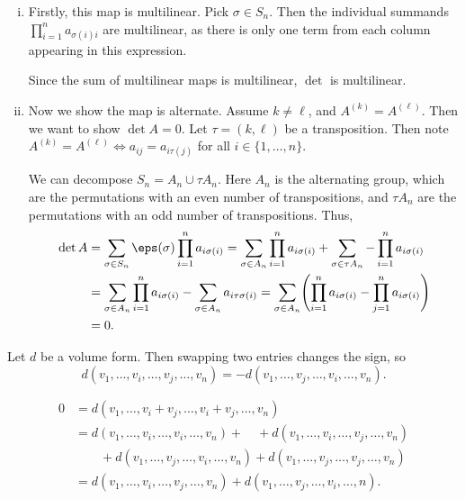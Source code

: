 \documentclass[12pt]{article}
\begin{document}
\begin{proofbox}
	\begin{enumerate}[(i)]
		\item Firstly, this map is multilinear. Pick $\sigma \in S_n$. Then the individual summands $\prod_{i = 1}^{n} a_{\sigma(i)i}$ are multilinear, as there is only one term from each column appearing in this expression.

			Since the sum of multilinear maps is multilinear, $\det$ is multilinear.
		\item Now we show the map is alternate. Assume $k \neq \ell$, and $A^{(k)} = A^{(\ell)}$. Then we want to show $\det A = 0$. Let $\tau = (k, \ell)$ be a transposition. Then note $A^{(k)} = A^{(\ell)} \iff a_{ij} = a_{i \tau(j)}$ for all $i \in \{1, \ldots, n\}$.

				We can decompose $S_n = A_n \cup \tau A_n$. Here $A_n$ is the alternating group, which are the permutations with an even number of transpositions, and $\tau A_n$ are the permutations with an odd number of transpositions. Thus,
				\begin{align*}
					\det A &= \sum_{\sigma \in S_n} \eps(\sigma) \prod_{i = 1}^{n} a_{i \sigma(i)} = \sum_{\sigma \in A_n} \prod_{i = 1}^{n} a_{i \sigma(i)} + \sum_{\sigma \in \tau A_n} - \prod_{i = 1}^{n} a_{i \sigma(i)} \\
					       &= \sum_{\sigma \in A_n} \prod_{i = 1}^{n}a_{i \sigma(i)} - \sum_{\sigma \in A_n} a_{i \tau \sigma(i)} = \sum_{\sigma \in A_n} \Biggl( \prod_{i = 1}^{n} a_{i \sigma(i)} - \prod_{j = 1}^{n} a_{i \sigma(i)} \Biggr) \\
					       &= 0.
				\end{align*}
	\end{enumerate}
\end{proofbox}

\begin{lemma}
	Let $d$ be a volume form. Then swapping two entries changes the sign, so
	\[
		d(v_1, \ldots, v_i, \ldots, v_j, \ldots, v_n) = - d(v_1, \ldots, v_j, \ldots, v_i, \ldots, v_n)
	.\]
\end{lemma}

\begin{proofbox}
	\begin{align*}
		0 &= d(v_1, \ldots, v_i + v_j, \ldots, v_i + v_j, \ldots, v_n) \\
		  &= d(v_1, \ldots, v_i, \ldots, v_i, \ldots, v_n) + \quad + d(v_1, \ldots, v_i, \ldots, v_j, \ldots, v_n) \\
		  & \qquad + d(v_1, \ldots, v_j, \ldots, v_i, \ldots, v_n) + d(v_1, \ldots, v_j, \ldots, v_j, \ldots, v_n) \\
		  &= d(v_1, \ldots, v_i, \ldots, v_j, \ldots, v_n) + d(v_1, \ldots, v_j, \ldots, v_i, \ldots, n).
	\end{align*}
\end{proofbox}
\end{document}

